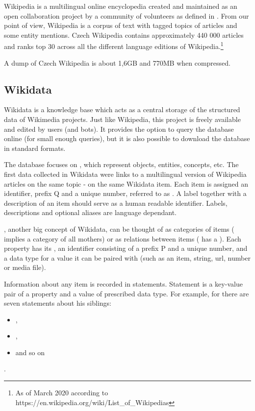 Wikipedia is a multilingual online encyclopedia created and maintained as an open collaboration project by a community of volunteers as defined in \cite{wiki:wiki}. From our point of view, Wikipedia is a corpus of text with tagged topics of articles and some entity mentions. Czech Wikipedia contains approximately 440 000 articles and ranks top 30 across all the different language editions of Wikipedia.\footnote{As of March 2020 according to https://en.wikipedia.org/wiki/List\_of\_Wikipedias}

A dump of Czech Wikipedia is about 1,6GB and 770MB when compressed.

\subsection{Wikidata}

Wikidata is a knowledge base which acts as a central storage of the structured data of Wikimedia projects. Just like Wikipedia, this project is freely available and edited by users (and bots). It provides the option to query the database online (for small enough queries), but it is also possible to download the database in standard formats.

The database focuses on , which represent objects, entities, concepts, etc.  The first data collected in Wikidata were links to a multilingual version of Wikipedia articles on the same topic - on the same Wikidata item. Each item is assigned an identifier, prefix Q and a unique number, referred to as . A label together with a description of an item should serve as a human readable identifier. Labels, descriptions and optional aliases are language dependant.

, another big concept of Wikidata, can be thought of as categories of items ( implies a category of all mothers) or as relations between items ( has a  ). Each property has its , an identifier consisting of a prefix P and a unique number, and a data type for a value it can be paired with (such as an item, string, url, number or media file). 

Information about any item is recorded in statements. Statement is a key-value pair of a property and a value of prescribed data type. For example, for  there are seven statements about his siblings:
\begin{itemize}
\item {} ,
\item {} ,
\item {}  and so on
\end{itemize} . 

